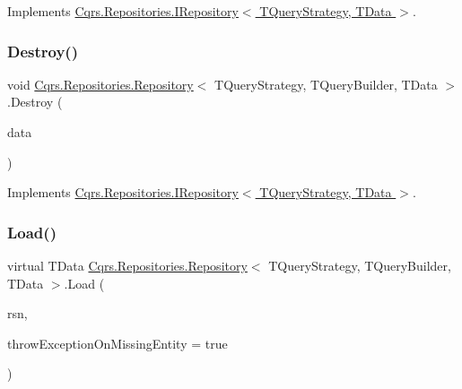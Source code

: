 Implements \hyperlink{interfaceCqrs_1_1Repositories_1_1IRepository_a0da5f756a0fd184dc51a81741f82734a}{Cqrs.\+Repositories.\+I\+Repository$<$ T\+Query\+Strategy, T\+Data $>$}.

\mbox{\label{classCqrs_1_1Repositories_1_1Repository_a6ed69cb5542164d9de81b0fa8a549d3e}} 
\subsubsection{\texorpdfstring{Destroy()}{Destroy()}}
{\footnotesize\ttfamily void \hyperlink{classCqrs_1_1Repositories_1_1Repository}{Cqrs.\+Repositories.\+Repository}$<$ T\+Query\+Strategy, T\+Query\+Builder, T\+Data $>$.Destroy (\begin{DoxyParamCaption}\item[{T\+Data}]{data }\end{DoxyParamCaption})}



Implements \hyperlink{interfaceCqrs_1_1Repositories_1_1IRepository_a3a7a60be19498813b3822558b88fad66}{Cqrs.\+Repositories.\+I\+Repository$<$ T\+Query\+Strategy, T\+Data $>$}.

\mbox{\label{classCqrs_1_1Repositories_1_1Repository_a444e9dfe4710be90940dbb6dec9d856f}} 
\subsubsection{\texorpdfstring{Load()}{Load()}}
{\footnotesize\ttfamily virtual T\+Data \hyperlink{classCqrs_1_1Repositories_1_1Repository}{Cqrs.\+Repositories.\+Repository}$<$ T\+Query\+Strategy, T\+Query\+Builder, T\+Data $>$.Load (\begin{DoxyParamCaption}\item[{Guid}]{rsn,  }\item[{bool}]{throw\+Exception\+On\+Missing\+Entity = {\ttfamily true} }\end{DoxyParamCaption})\hspace{0.3cm}{\ttfamily [virtual]}}



